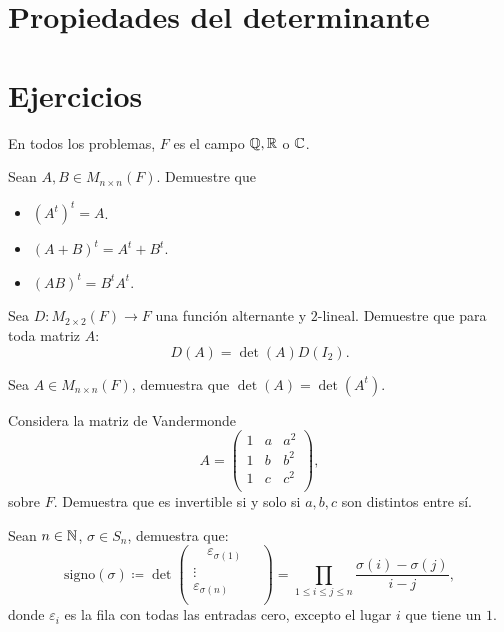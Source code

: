 \documentclass[12pt,a4paper]{book}
\newcommand{\parentesis}[1]{\left(#1\right)}
\begin{document}
    \section{Propiedades del determinante}

    \section{Ejercicios}

    En todos los problemas, $F$ es el campo $\mathbb{Q}, \mathbb{R}$ o $\mathbb{C}$.

    \begin{ejercicio}
        Sean $A, B \in M_{n \times n}(F)$. Demuestre que
        \begin{itemize}
            \item[(a)] $\parentesis{A^t}^t = A$.
            \item[(b)] $\parentesis{A + B}^t = A^t + B^t$.
            \item[(c)] $\parentesis{AB}^t = B^t A^t$.
        \end{itemize}
    \end{ejercicio}

    \begin{ejercicio}
        Sea $D : M_{2 \times 2}(F) \to F$ una función alternante y $2$-lineal. Demuestre que para toda matriz $A$:
        \[
        D(A) =  \det(A) D(I_2).
        \]
    \end{ejercicio}

    \begin{ejercicio}
        Sea $A \in M_{n \times n}(F)$, demuestra que $\det(A) = \det(A^t)$.
    \end{ejercicio}

    \begin{ejercicio}
        Considera la matriz de Vandermonde
        \[
        A = 
        \begin{pmatrix}
            1 & a & a^2\\
            1 & b & b^2\\
            1 & c & c^2\\
        \end{pmatrix},
        \]
        sobre $F$. Demuestra que es invertible si y solo si $a, b, c$ son distintos entre sí.
    \end{ejercicio}

    \begin{ejercicio}
        Sean $n \in \mathbb{N}$, $\sigma \in S_n$, demuestra que:
        \[
        \text{signo}(\sigma) \coloneqq \det
        \begin{pmatrix}
            \quad \varepsilon_{\sigma (1)} \quad \\
            \vdots\\
            \varepsilon_{\sigma (n)}\\
        \end{pmatrix}
        = \prod_{1 \leq i \leq j \leq n} \frac{\sigma (i) - \sigma(j)}{i - j},
        \]
        donde $\varepsilon_i$ es la fila con todas las entradas cero, excepto el lugar $i$ que tiene un $1$.
    \end{ejercicio}


\end{document}
